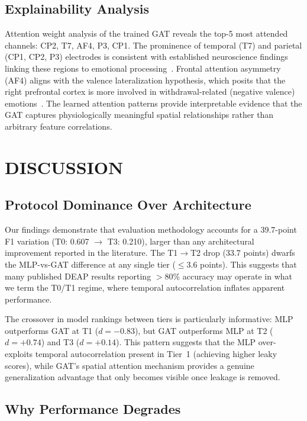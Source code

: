 \documentclass[a4paper, 10pt, conference]{ieeeconf}
\begin{document}
\subsection{Explainability Analysis}

Attention weight analysis of the trained GAT reveals the top-5 most attended channels: CP2, T7, AF4, P3, CP1. The prominence of temporal (T7) and parietal (CP1, CP2, P3) electrodes is consistent with established neuroscience findings linking these regions to emotional processing~\cite{heller1993, koelsch2014}. Frontal attention asymmetry (AF4) aligns with the valence lateralization hypothesis, which posits that the right prefrontal cortex is more involved in withdrawal-related (negative valence) emotions~\cite{allen2004, smith2017}. The learned attention patterns provide interpretable evidence that the GAT captures physiologically meaningful spatial relationships rather than arbitrary feature correlations.

\section{DISCUSSION}

\subsection{Protocol Dominance Over Architecture}

Our findings demonstrate that evaluation methodology accounts for a 39.7-point F1 variation (T0: 0.607 $\to$ T3: 0.210), larger than any architectural improvement reported in the literature. The T1$\to$T2 drop (33.7 points) dwarfs the MLP-vs-GAT difference at any single tier ($\leq$3.6 points). This suggests that many published DEAP results reporting $>$80\% accuracy may operate in what we term the T0/T1 regime, where temporal autocorrelation inflates apparent performance.

The crossover in model rankings between tiers is particularly informative: MLP outperforms GAT at T1 ($d=-0.83$), but GAT outperforms MLP at T2 ($d=+0.74$) and T3 ($d=+0.14$). This pattern suggests that the MLP over-exploits temporal autocorrelation present in Tier~1 (achieving higher leaky scores), while GAT's spatial attention mechanism provides a genuine generalization advantage that only becomes visible once leakage is removed.

\subsection{Why Performance Degrades}
\end{document}
